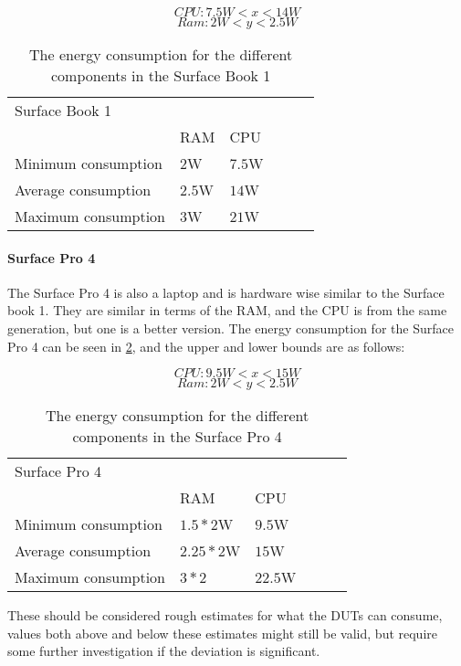 $$CPU: 7.5W < x < 14W $$
$$Ram: 2W < y < 2.5W $$

\begin{table}[ht]
    \begin{tabular}{llllll}
    \hline
    \multicolumn{5}{l}{Surface Book 1} \\
     & RAM\cite{buildComputerRAM} & CPU\cite{NotebookCPU} \\
    Minimum consumption & $2$W& $7.5$W \\ \hline
    Average consumption & $2.5$W& $14$W \\ \hline
    Maximum consumption & $3$W & $21$W \\ \hline
    \end{tabular}
    \caption{The energy consumption for the different components in the Surface Book 1}
    \label{tab:bookjuanEstEnergCon}    
\end{table}

\paragraph{Surface Pro 4} The Surface Pro 4 is also a laptop and is hardware wise similar to the Surface book 1. They are similar in terms of the RAM, and the CPU is from the same generation, but one is a better version. The energy consumption for the Surface Pro 4 can be seen in \cref{tab:proQuadroEstEnergCon}, and the upper and lower bounds are as follows:

$$CPU: 9.5W < x < 15W $$
$$Ram: 2W < y < 2.5W $$

\begin{table}[ht]
    \begin{tabular}{llllll}
    \hline
    \multicolumn{5}{l}{Surface Pro 4} \\
     & RAM\cite{buildComputerRAM} & CPU\cite{IntelCPUSpec} \\
    Minimum consumption & $1.5 * 2$W& $9.5$W \\ \hline
    Average consumption & $2.25 * 2$W& $15$W \\ \hline
    Maximum consumption & $3 * 2$ & $22.5$W\\ \hline
    \end{tabular}
    \caption{The energy consumption for the different components in the Surface Pro 4}
    \label{tab:proQuadroEstEnergCon}    
\end{table}

These should be considered rough estimates for what the DUTs can consume, values both above and below these estimates might still be valid, but require some further investigation if the deviation is significant.